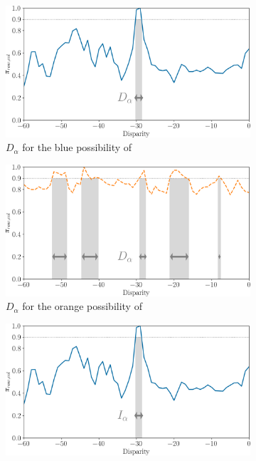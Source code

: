 \begin{figure}
    \centering
    \begin{subfigure}[t]{0.47\linewidth}
        \centering
        \includegraphics[width=\linewidth]{Images/Chap_5/disparity_interval_1.png}
        \caption{$D_\alpha$ for the blue possibility of }
        \label{fig:disparity_intervals_a}
    \end{subfigure}\hfill
    \begin{subfigure}[t]{0.47\linewidth}
        \centering
        \includegraphics[width=\linewidth]{Images/Chap_5/disparity_interval_2.png}
        \caption{$D_\alpha$ for the orange possibility of }
        \label{fig:disparity_intervals_b}
    \end{subfigure}
    \begin{subfigure}[t]{0.47\linewidth}
        \centering
        \includegraphics[width=\linewidth]{Images/Chap_5/disparity_interval_3.png}

\end{subfigure}
\end{figure}
